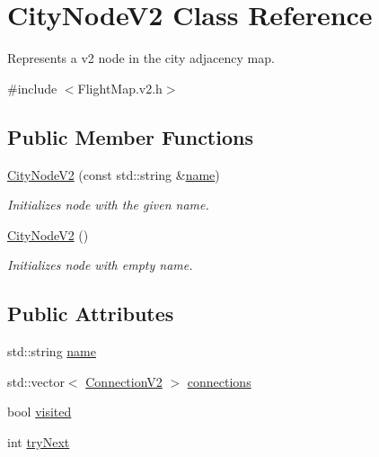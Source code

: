 \hypertarget{class_city_node_v2}{}\section{City\+Node\+V2 Class Reference}
\label{class_city_node_v2}


Represents a v2 node in the city adjacency map.  




{\ttfamily \#include $<$Flight\+Map.\+v2.\+h$>$}

\subsection*{Public Member Functions}
\begin{DoxyCompactItemize}
\item 
\hyperlink{class_city_node_v2_ae1f0eb6340a8b885f89376339ec90314}{City\+Node\+V2} (const std\+::string \&\hyperlink{class_city_node_v2_a3cf01413b0ca939d0811ab649981d4a5}{name})
\begin{DoxyCompactList}\small\item\em Initializes node with the given name. \end{DoxyCompactList}\item 
\hyperlink{class_city_node_v2_a73000f4890545ab24a6ba02e609a79a3}{City\+Node\+V2} ()
\begin{DoxyCompactList}\small\item\em Initializes node with empty name. \end{DoxyCompactList}\end{DoxyCompactItemize}
\subsection*{Public Attributes}
\begin{DoxyCompactItemize}
\item 
std\+::string \hyperlink{class_city_node_v2_a3cf01413b0ca939d0811ab649981d4a5}{name}
\item 
std\+::vector$<$ \hyperlink{struct_connection_v2}{Connection\+V2} $>$ \hyperlink{class_city_node_v2_a57050772b435bb5dc6570ded05ef2245}{connections}
\item 
bool \hyperlink{class_city_node_v2_a906dfb4dcfacbae15c57a316ab81036e}{visited}
\item 
int \hyperlink{class_city_node_v2_a1d674990d58d6a94c4fe4bc6211a8082}{try\+Next}
\end{DoxyCompactItemize}


